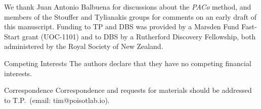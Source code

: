 \documentclass{nature}
\begin{document}

\begin{addendum}
 \item We thank Juan Antonio Balbuena for
discussions about the \emph{PACo} method, and members of the Stouffer
and Tylianakis groups for comments on an early draft of this manuscript.
Funding to TP and DBS was provided by a Marsden Fund Fast-Start grant
(UOC-1101) and to DBS by a Rutherford Discovery Fellowship, both
administered by the Royal Society of New Zealand.
 \item[Competing Interests] The authors declare that they have no
competing financial interests.
 \item[Correspondence] Correspondence and requests for materials
should be addressed to T.P.~(email: tim@poisotlab.io).
\end{addendum}
\end{document}
